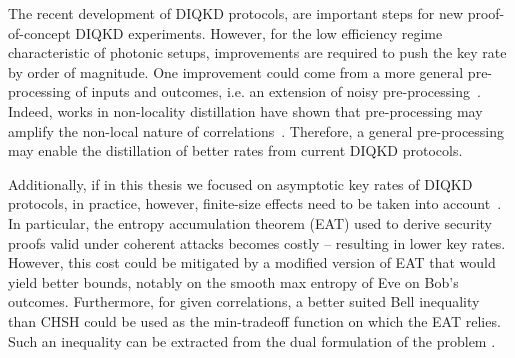 

\medbreak

The recent development of DIQKD protocols, are important steps for new proof-of-concept DIQKD experiments.
However, for the low efficiency regime characteristic of photonic setups, improvements are required to push the key rate by order of magnitude.
One improvement could come from a more general pre-processing of inputs and outcomes, i.e. an extension of noisy pre-processing~\cite{Ho2020}.
Indeed, works in non-locality distillation have shown that pre-processing may amplify the non-local nature of correlations~\cite{Forster2009}.
Therefore, a general pre-processing may enable the distillation of better rates from current DIQKD protocols.

Additionally, if in this thesis we focused on asymptotic key rates of DIQKD protocols, in practice, however, finite-size effects need to be taken into account~\cite{Tan2021}.
In particular, the entropy accumulation theorem (EAT) used to derive security proofs valid under coherent attacks becomes costly -- resulting in lower key rates.
However, this cost could be mitigated by a modified version of EAT that would yield better bounds, notably on the smooth max entropy of Eve on Bob's outcomes.
Furthermore, for given correlations, a better suited Bell inequality than CHSH could be used as the min-tradeoff function on which the EAT relies.
Such an inequality can be extracted from the dual formulation of the problem .

